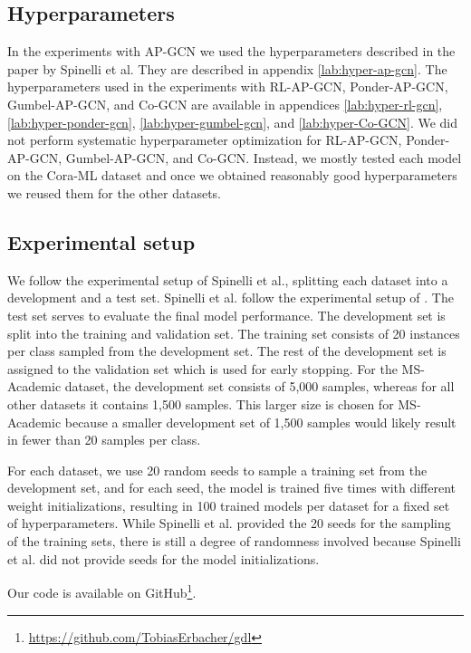 \documentclass{gdl}
\begin{document}
\subsection{Hyperparameters}
In the experiments with AP-GCN we used the hyperparameters described in the paper by Spinelli et al. They are described in appendix \ref{lab:hyper-ap-gcn}. The hyperparameters used in the experiments with RL-AP-GCN, Ponder-AP-GCN, Gumbel-AP-GCN, and Co-GCN are available in appendices \ref{lab:hyper-rl-gcn}, \ref{lab:hyper-ponder-gcn}, \ref{lab:hyper-gumbel-gcn}, and \ref{lab:hyper-Co-GCN}. We did not perform systematic hyperparameter optimization for RL-AP-GCN, Ponder-AP-GCN, Gumbel-AP-GCN, and Co-GCN. Instead, we mostly tested each model on the Cora-ML dataset and once we obtained reasonably good hyperparameters we reused them for the other datasets. 

\subsection{Experimental setup}
\label{sec:experimental-setup}
We follow the experimental setup of Spinelli et al., splitting each dataset into a development and a test set. Spinelli et al. follow the experimental setup of \cite{Klicpera2019}. The test set serves to evaluate the final model performance. The development set is split into the training and validation set. The training set consists of 20 instances per class sampled from the development set. The rest of the development set is assigned to the validation set which is used for early stopping. For the MS-Academic dataset, the development set consists of 5,000 samples, whereas for all other datasets it contains 1,500 samples. This larger size is chosen for MS-Academic because a smaller development set of 1,500 samples would likely result in fewer than 20 samples per class. 

For each dataset, we use 20 random seeds to sample a training set from the development set, and for each seed, the model is trained five times with different weight initializations, resulting in 100 trained models per dataset for a fixed set of hyperparameters. While Spinelli et al. provided the 20 seeds for the sampling of the training sets, there is still a degree of randomness involved because Spinelli et al. did not provide seeds for the model initializations.

Our code is available on GitHub\footnote{\url{https://github.com/TobiasErbacher/gdl}}.
\end{document}
